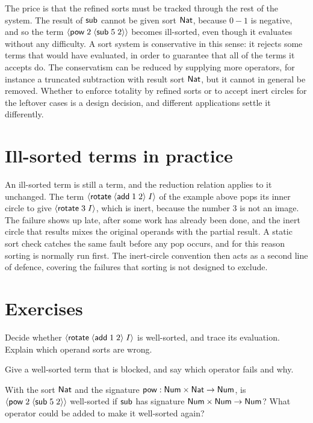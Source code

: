 The price is that the refined sorts must be tracked through the rest of the system. The result of $\mathsf{sub}$ cannot be given sort $\mathsf{Nat}$, because $0-1$ is negative, and so the term $\langle \mathsf{pow}\; 2\; \langle \mathsf{sub}\; 5\; 2\rangle\rangle$ becomes ill-sorted, even though it evaluates without any difficulty. A sort system is conservative in this sense: it rejects some terms that would have evaluated, in order to guarantee that all of the terms it accepts do. The conservatism can be reduced by supplying more operators, for instance a truncated subtraction with result sort $\mathsf{Nat}$, but it cannot in general be removed. Whether to enforce totality by refined sorts or to accept inert circles for the leftover cases is a design decision, and different applications settle it differently.

\section{Ill-sorted terms in practice}

An ill-sorted term is still a term, and the reduction relation applies to it unchanged. The term $\langle \mathsf{rotate}\; \langle \mathsf{add}\; 1\; 2\rangle\; I\rangle$ of the example above pops its inner circle to give $\langle \mathsf{rotate}\; 3\; I\rangle$, which is inert, because the number $3$ is not an image. The failure shows up late, after some work has already been done, and the inert circle that results mixes the original operands with the partial result. A static sort check catches the same fault before any pop occurs, and for this reason sorting is normally run first. The inert-circle convention then acts as a second line of defence, covering the failures that sorting is not designed to exclude.

\section*{Exercises}

\begin{exercise}[\dag]\label{ex:ch5-sorting}
Decide whether $\langle \mathsf{rotate}\; \langle \mathsf{add}\; 1\; 2\rangle\; I\rangle$ is well-sorted, and trace its evaluation. Explain which operand sorts are wrong.
\end{exercise}

\begin{exercise}[\dag]\label{ex:ch5-blocked}
Give a well-sorted term that is blocked, and say which operator fails and why.
\end{exercise}

\begin{exercise}[\dag]\label{ex:ch5-nat}
With the sort $\mathsf{Nat}$ and the signature $\mathsf{pow}:\mathsf{Num}\times\mathsf{Nat}\to\mathsf{Num}$, is $\langle \mathsf{pow}\; 2\; \langle \mathsf{sub}\; 5\; 2\rangle\rangle$ well-sorted if $\mathsf{sub}$ has signature $\mathsf{Num}\times\mathsf{Num}\to\mathsf{Num}$? What operator could be added to make it well-sorted again?
\end{exercise}

